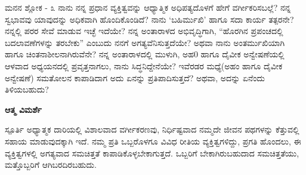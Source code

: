 \newpage
\begin{mananam}{\mananamfont ಮನನ ಶ್ಲೋಕ - ೩}
\mananamtext ನಾನು ನನ್ನ ಪ್ರಧಾನ ವ್ಯಕ್ತಿತ್ವವನ್ನು ಆಧ್ಯಾತ್ಮಿಕ ಅಧಿಪತ್ಯದೊಳಗೆ ಹೇಗೆ ವರ್ಗೀಕರಿಸಬಲ್ಲೆ? ನನ್ನ ಸ್ವಭಾವವು ಯಾವುದನ್ನು ಅಧಿಕವಾಗಿ ಹೊಂದಿಕೊಂಡಿದೆ? ನಾನು ‘ಬಹಿರ್ಮುಖಿ’ ಹಾಗೂ ಸದಾ ಕಾರ್ಯ ತತ್ಪರನೇ? ನನ್ನಲ್ಲಿ ಪರರ ಸೇವೆ ಮಾಡುವ  ಇಚ್ಛೆ ಇದೆಯೇ?  ನನ್ನ ಅಂತಾರಾಳದ ಅಭಿವೃದ್ಧಿಗಾಗಿ, “ಹೊರಗಿನ ಪ್ರಪಂಚದಲ್ಲಿ ಬದಲಾವಣೆಗಳನ್ನು ತರಬೇಕು” ಎಂಬುದು ನನಗೆ ಅಗತ್ಯವೆನಿಸುತ್ತದೆಯೇ? ಅಥವಾ ನಾನು ಅಂತರ್ಮುಖಿಯಾಗಿ ಹಾಗೂ ಚಿಂತನಾಶೀಲನಾಗಿರುವೆನೇ? ನನ್ನ ಅಂತಾರಾಳದಲ್ಲಿ ಮುಳುಗಿ, ಅಹ0 ಹಾಗೂ ದೈವೀಕ ಅನ್ವೇಷಣೆಯಲ್ಲಿ ಆಳವಾದ ಅಧ್ಯಯನದಲ್ಲಿ ಪ್ರವೃತ್ತನಾಗಲು, ನಾನು ಸಿದ್ಧನಿದ್ದೇನೆಯೇ? ಇವೆರಡರ ಮಧ್ಯೆ(ಅಹಂ ಹಾಗೂ ದೈವೀಕ ಅನ್ವೇಷಣೆ) ಸಮತೋಲನ ಕಾಪಾಡಿದಾಗ ಅದು ಏನನ್ನು ಪ್ರತಿಪಾದಿಸುತ್ತದೆ? ಅಥವಾ, ಅದನ್ನು ಏನೆಂದು ತಿಳಿಯಬಹುದು?
\end{mananam}
\WritingHand\enspace\textbf{ಆತ್ಮ ವಿಮರ್ಶೆ}\\
\begin{inspiration}{\mananamfont ಸ್ಪೂರ್ತಿ}
\mananamtext  ಅಧ್ಯಾತ್ಮಕ ದಾರಿಯಲ್ಲಿ ವಿಶಾಲವಾದ ವರ್ಗೀಕರಣವು, ನಿರ್ಧಿಷ್ಟವಾದ ನಮ್ಮದೇ ಜೀವನ ಪಥಗಳನ್ನು ಕೆತ್ತುವಲ್ಲಿ ಸಹಾಯ ಮಾಡುವುದಕ್ಕಾಗಿ ಇದೆ. ನಮ್ಮ ಪ್ರತಿ ಒಬ್ಬರೊಳಗೂ ವಿವಿಧ ರೀತಿಯ ವ್ಯಕ್ತಿತ್ವಗಳಿದ್ದು, ಪ್ರಗತಿ ಹೊಂದಲು, ಈ ವ್ಯಕ್ತಿತ್ವಗಳಲ್ಲಿ ಅಗತ್ಯವಾದ ಸಮಚಿತ್ತತೆ ಕಾಪಾಡಿಕೊಳ್ಳಬೇಕಾಗುತ್ತದೆ. ಒಬ್ಬರಿಗೆ ಬೇಕಾಗಿರುಬಹುದಾದ ಸಮಚಿತ್ತತೆಯು, ಮತ್ತೊಬ್ಬರಿಗೆ ಆಗಿಬರದಿರಬಹುದು.
\end{inspiration}
\newpage


